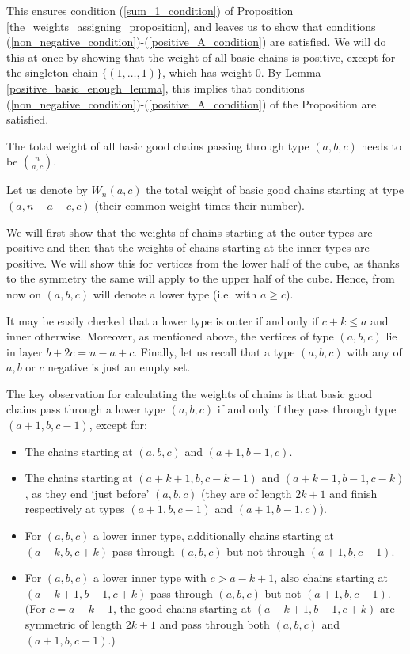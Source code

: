 \documentclass[11pt, reqno]{amsart}
\theoremstyle{remark}
\numberwithin{equation}{section}
\begin{document}
This ensures condition (\ref{sum_1_condition}) of Proposition \ref{the_weights_assigning_proposition}, and leaves us to show that conditions (\ref{non_negative_condition})-(\ref{positive_A_condition}) are satisfied. We will do this at once by showing that the weight of all basic chains is positive, except for the singleton chain $\{(1, \dots, 1)\}$, which has weight $0$. By Lemma \ref{positive_basic_enough_lemma}, this implies that conditions (\ref{non_negative_condition})-(\ref{positive_A_condition}) of the Proposition are satisfied.

The total weight of all basic good chains passing through type $(a, b, c)$ needs to be $\binom{n}{a, c}$.

Let us denote by $W_n(a, c)$ the total weight of basic good chains starting at type $(a, n-a-c, c)$ (their common weight times their number).

We will first show that the weights of chains starting at the outer types are positive and then that the weights of chains starting at the inner types are positive. We will show this for vertices from the lower half of the cube, as thanks to the symmetry the same will apply to the upper half of the cube. Hence, from now on $(a, b, c)$ will denote a lower type (i.e. with $a \geqslant c$).

It may be easily checked that a lower type is outer if and only if $c+k \leqslant a$ and inner otherwise. Moreover, as mentioned above, the vertices of type $(a, b, c)$ lie in layer $b+2c=n-a+c$. Finally, let us recall that a type $(a, b, c)$ with any of $a, b$ or $c$ negative is just an empty set.

The key observation for calculating the weights of chains is that basic good chains pass through a lower type $(a, b, c)$ if and only if they pass through type $(a+1, b, c-1)$, except for:
\begin{itemize}
    \item The chains starting at $(a, b, c)$ and $(a+1, b-1, c)$.
    \item The chains starting at $(a+k+1, b, c-k-1)$ and $(a+k+1, b-1, c-k)$, as they end `just before' $(a, b, c)$ (they are of length $2k+1$ and finish respectively at types $(a+1, b, c-1)$ and $(a+1, b-1, c)$).
    \item For $(a, b, c)$ a lower inner type, additionally chains starting at $(a-k, b, c+k)$ pass through $(a, b, c)$ but not through $(a+1, b, c-1)$.
    \item For $(a, b, c)$ a lower inner type with $c > a-k+1$, also chains starting at $(a-k+1, b-1, c+k)$ pass through $(a, b, c)$ but not $(a+1, b, c-1)$. (For $c=a-k+1$, the good chains starting at $(a-k+1, b-1, c+k)$ are symmetric of length $2k+1$ and pass through both $(a, b, c)$ and $(a+1, b, c-1)$.)
\end{itemize}
\end{document}
